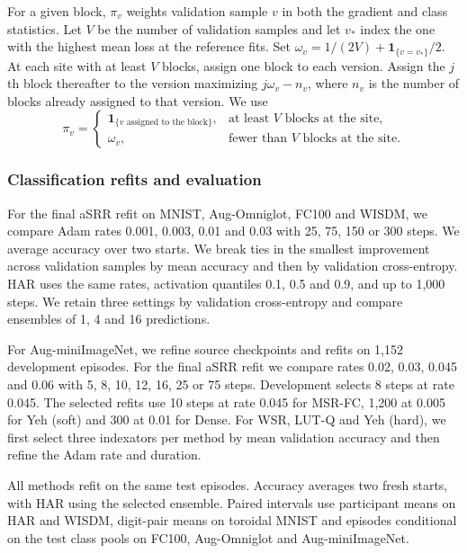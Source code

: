 For a given block, $\pi_v$ weights validation sample $v$ in both the
gradient and class statistics. Let $V$ be the number of validation
samples and let $v_*$ index the one with the highest mean loss at the
reference fits. Set
$\omega_v=1/(2V)+\mathbf1_{\{v=v_*\}}/2$. At each site with at least
$V$ blocks, assign one block to each version. Assign the $j$th
block thereafter to the version maximizing $j\omega_v-n_v$, where $n_v$ is
the number of blocks already assigned to that version. We use
\begin{equation}
    \pi_v=
    \begin{cases}
        \mathbf1_{\{v\text{ assigned to the block}\}}, & \text{at least $V$ blocks at the site},\\
        \omega_v, & \text{fewer than $V$ blocks at the site}.
    \end{cases}
    \label{eq:asrr-block-weights}
\end{equation}

\subsubsection{Classification refits and evaluation}

For the final aSRR refit on MNIST, Aug-Omniglot, FC100 and WISDM,
we compare Adam rates 0.001, 0.003, 0.01 and 0.03 with 25, 75, 150
or 300 steps. We average accuracy over two starts. We break ties in
the smallest improvement across validation samples by mean accuracy
and then by validation cross-entropy. HAR uses the same rates,
activation quantiles 0.1, 0.5
and 0.9, and up to 1,000 steps. We retain three settings by validation
cross-entropy and compare ensembles of 1, 4 and 16 predictions.

For Aug-miniImageNet, we refine source checkpoints and refits on 1,152
development episodes. For the final aSRR refit we compare rates
0.02, 0.03, 0.045 and 0.06 with 5, 8, 10, 12, 16, 25 or 75 steps.
Development selects 8 steps at rate 0.045. The selected refits use
10 steps at rate 0.045 for MSR-FC, 1,200 at 0.005 for Yeh (soft) and
300 at 0.01 for Dense. For WSR, LUT-Q and Yeh (hard),
we first select three indexators per method by mean validation
accuracy and then refine the Adam rate and duration.

All methods refit on the same test episodes. Accuracy averages two
fresh starts, with HAR using the selected ensemble. Paired intervals
use participant means on HAR and WISDM, digit-pair means on toroidal
MNIST and episodes conditional on the test class pools on FC100,
Aug-Omniglot and Aug-miniImageNet.

